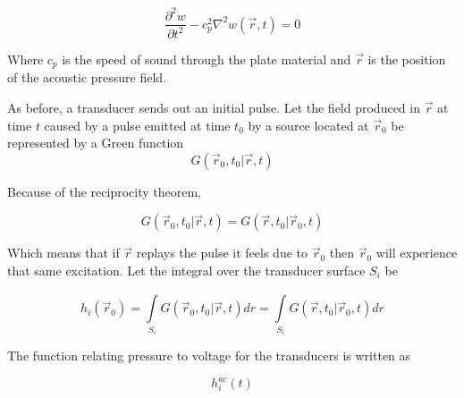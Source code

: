 \begin{equation}
\frac{\partial ^2w}{\partial t^2} - c_p^{2} \nabla ^2 w(\vec{r},t) = 0
\label{eq:waveEquation2s}
\end{equation}

Where $c_p$ is the speed of sound through the plate material and $\vec{r}$ is the position of the acoustic pressure field.




As before, a transducer sends out an initial pulse. Let the field produced in $\vec{r}$ at time $t$ caused by a pulse emitted at time $t_0$ by a source located at $\vec{r}_0$ be represented by a Green function
\begin{equation}
G(\vec{r}_0, t_0|\vec{r},t)
\end{equation}


Because of the reciprocity theorem,

\begin{equation}
G(\vec{r}_0, t_0|\vec{r},t) = G(\vec{r}, t_0|\vec{r}_0,t)
\end{equation}

Which means that if $\vec{r}$ replays the pulse it feels due to $\vec{r}_0$ then $\vec{r}_0$ will experience that same excitation. Let the integral over the transducer surface $S_i$ be

\begin{equation}
h_i(\vec{r}_0) = \int\limits_{S_i}^{}G(\vec{r}_0, t_0|\vec{r},t)dr = \int\limits_{S_i}^{ }G(\vec{r}, t_0|\vec{r}_0,t)dr
\end{equation}


The function relating pressure to voltage for the transducers is written as

\begin{equation}
h_i^{ac}(t)
\end{equation}

